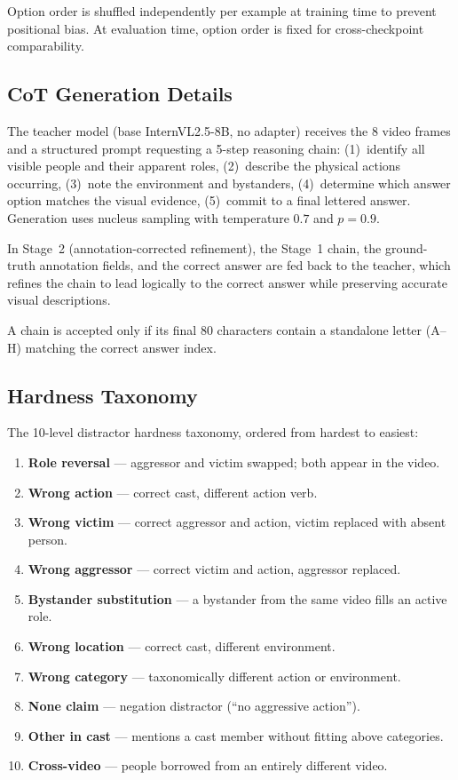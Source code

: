 Option order is shuffled independently per example at training time to
prevent positional bias. At evaluation time, option order is fixed for
cross-checkpoint comparability.

\subsection{CoT Generation Details}

The teacher model (base InternVL2.5-8B, no adapter) receives the 8 video
frames and a structured prompt requesting a 5-step reasoning chain:
(1)~identify all visible people and their apparent roles,
(2)~describe the physical actions occurring,
(3)~note the environment and bystanders,
(4)~determine which answer option matches the visual evidence,
(5)~commit to a final lettered answer.
Generation uses nucleus sampling with temperature $0.7$ and $p = 0.9$.

In Stage~2 (annotation-corrected refinement), the Stage~1 chain, the
ground-truth annotation fields, and the correct answer are fed back to the
teacher, which refines the chain to lead logically to the correct answer
while preserving accurate visual descriptions.

A chain is accepted only if its final 80 characters contain a standalone
letter (A--H) matching the correct answer index.

\subsection{Hardness Taxonomy}

The 10-level distractor hardness taxonomy, ordered from hardest to easiest:

\begin{enumerate}
\item \textbf{Role reversal} --- aggressor and victim swapped; both appear in
  the video.
\item \textbf{Wrong action} --- correct cast, different action verb.
\item \textbf{Wrong victim} --- correct aggressor and action, victim replaced
  with absent person.
\item \textbf{Wrong aggressor} --- correct victim and action, aggressor
  replaced.
\item \textbf{Bystander substitution} --- a bystander from the same video
  fills an active role.
\item \textbf{Wrong location} --- correct cast, different environment.
\item \textbf{Wrong category} --- taxonomically different action or
  environment.
\item \textbf{None claim} --- negation distractor (``no aggressive action'').
\item \textbf{Other in cast} --- mentions a cast member without fitting
  above categories.
\item \textbf{Cross-video} --- people borrowed from an entirely different
  video.
\end{enumerate}

